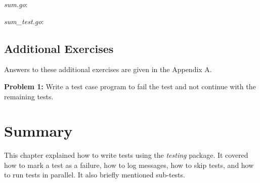 \textit{sum.go}:



\textit{sum\_test.go}:



\subsection{Additional Exercises}

Answers to these additional exercises are given in the Appendix A.

\textbf{Problem 1:} Write a test case program to fail the test and not continue with the remaining tests.

\section*{Summary}

This chapter explained how to write tests using the \textit{testing} package. It
covered how to mark a test as a failure, how to log messages, how to skip tests,
and how to run tests in parallel. It also briefly mentioned sub-tests.

